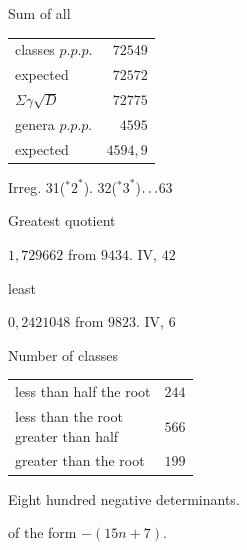 \par\medskip\noindent Sum of all
\begin{center}\begin{tabular}{@{}lr@{}}
classes $p.p.p.$ & $72549$\\
\quad expected & $72572$\\
\quad $\Sigma\gamma\surd D$ & $72775$\\
genera $p.p.p.$ & $4595$\\
\quad expected & $4594{,}9$
\end{tabular}\end{center}
\noindent Irreg. 31(${}^{*}2^{*}$). 32(${}^{*}3^{*}$)\(\mathinner{.\,.\,.}\)63
\par\noindent Greatest quotient
\par\noindent\quad $1{,}729662$ from $9434$. IV, $42$
\par\noindent least
\par\noindent\quad $0{,}2421048$ from $9823$. IV, $6$
\par\noindent Number of classes
\begin{center}\begin{tabular}{@{}lr@{}}
less than half the root & $244$\\
\shortstack[l]{less than the root\\\quad greater than half} & $566$\\
greater than the root & $199$
\end{tabular}\end{center}
\par\medskip
{}
\noindent Eight hundred negative determinants.\par\noindent of the form $-(15n+7)$.
\par\medskip
\begingroup\small
\setlength{\tabcolsep}{4pt}
